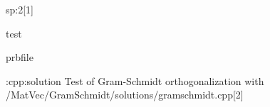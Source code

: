 \begin{samproblem}
\begin{subproblem}{sp:2}[1]
  \begin{samwriteprbpart}{test}
    \begin{writeverbatim}{prbfile}
      \begin{samsolution}
        \begin{samcode}[C++-code]{\cpl:cpp:solution}
          {Test of Gram-Schmidt orthogonalization with \eigen{}}
          \samincludecpp
          {\codes/MatVec/GramSchmidt/solutions/gramschmidt.cpp}[2]
        \end{samcode}
      \end{samsolution}
    \end{writeverbatim}
  \end{samwriteprbpart}

\end{subproblem}

\end{samproblem}
